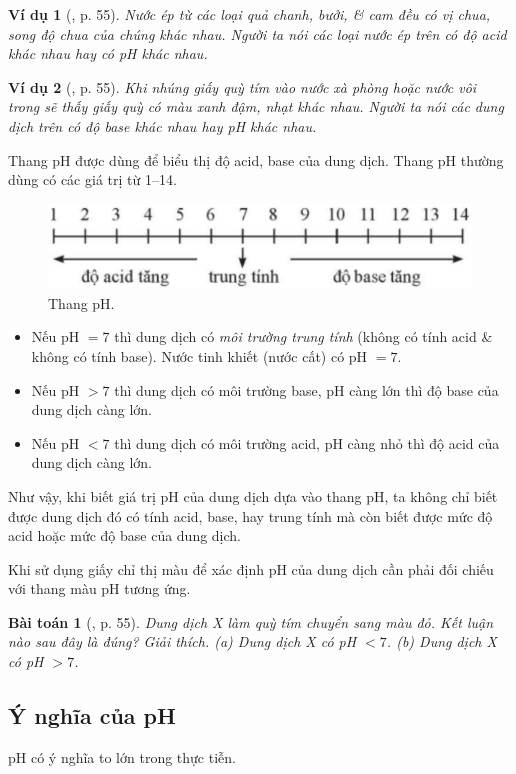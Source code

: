 \documentclass{article}
\newtheorem{baitoan}{Bài toán}
\newtheorem{vidu}{Ví dụ}
\begin{document}
\begin{vidu}[\cite{SGK_KHTN_8_Canh_Dieu}, p. 55]
	Nước ép từ các loại quả chanh, bưởi, \& cam đều có vị chua, song độ chua của chúng khác nhau. Người ta nói các loại nước ép trên có độ acid khác nhau hay có pH khác nhau.
\end{vidu}

\begin{vidu}[\cite{SGK_KHTN_8_Canh_Dieu}, p. 55]
	Khi nhúng giấy quỳ tím vào nước xà phòng hoặc nước vôi trong sẽ thấy giấy quỳ có màu xanh đậm, nhạt khác nhau. Người ta nói các dung dịch trên có độ base khác nhau hay pH khác nhau.
\end{vidu}
Thang pH được dùng để biểu thị độ acid, base của dung dịch. Thang pH thường dùng có các giá trị từ 1--14.
\begin{figure}[H]
	\centering
	\includegraphics[scale=0.25]{thang_pH}
	\caption{Thang pH.}
\end{figure}
\begin{itemize}
	\item Nếu pH $= 7$ thì dung dịch có \textit{môi trường trung tính} (không có tính acid \& không có tính base). Nước tinh khiết (nước cất) có pH $= 7$.
	\item Nếu pH $> 7$ thì dung dịch có môi trường base, pH càng lớn thì độ base của dung dịch càng lớn.
	\item Nếu pH $< 7$ thì dung dịch có môi trường acid, pH càng nhỏ thì độ acid của dung dịch càng lớn.
\end{itemize}
Như vậy, khi biết giá trị pH của dung dịch dựa vào thang pH, ta không chỉ biết được dung dịch đó có tính acid, base, hay trung tính mà còn biết được mức độ acid hoặc mức độ base của dung dịch.

Khi sử dụng giấy chỉ thị màu để xác định pH của dung dịch cần phải đối chiếu với thang màu pH tương ứng.

\begin{baitoan}[\cite{SGK_KHTN_8_Canh_Dieu}, p. 55]
	Dung dịch X làm quỳ tím chuyển sang màu đỏ. Kết luận nào sau đây là đúng? Giải thích. (a) Dung dịch X có pH $< 7$. (b) Dung dịch X có pH $> 7$.
\end{baitoan}

\subsection{Ý nghĩa của pH}
pH có ý nghĩa to lớn trong thực tiễn.
\end{document}
